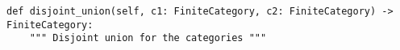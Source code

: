 \begin{verbatim}
def disjoint_union(self, c1: FiniteCategory, c2: FiniteCategory) -> FiniteCategory:
    """ Disjoint union for the categories """
\end{verbatim}